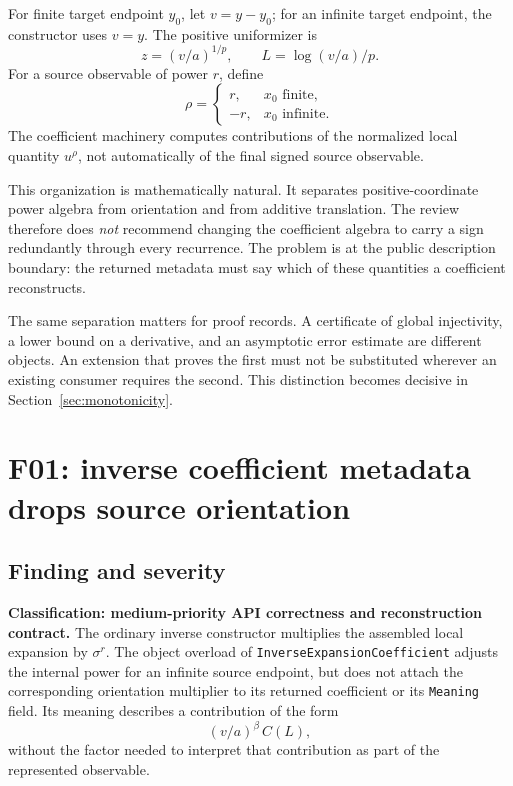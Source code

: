 \documentclass[11pt,letterpaper]{article}
\newcommand{\code}[1]{\nolinkurl{#1}}
\begin{document}
For finite target endpoint \(y_0\), let \(v=y-y_0\); for an infinite target endpoint, the constructor uses \(v=y\). The positive uniformizer is
\[
 z=(v/a)^{1/p},\qquad L=\log(v/a)/p.
\]
For a source observable of power \(r\), define
\[
 \rho=\begin{cases}r,&x_0\text{ finite},\\-r,&x_0\text{ infinite}.
 \end{cases}
\]
The coefficient machinery computes contributions of the normalized local quantity \(u^{\rho}\), not automatically of the final signed source observable.

This organization is mathematically natural. It separates positive-coordinate power algebra from orientation and from additive translation. The review therefore does \emph{not} recommend changing the coefficient algebra to carry a sign redundantly through every recurrence. The problem is at the public description boundary: the returned metadata must say which of these quantities a coefficient reconstructs.

The same separation matters for proof records. A certificate of global injectivity, a lower bound on a derivative, and an asymptotic error estimate are different objects. An extension that proves the first must not be substituted wherever an existing consumer requires the second. This distinction becomes decisive in Section~\ref{sec:monotonicity}.

\section{F01: inverse coefficient metadata drops source orientation}
\label{sec:orientation}

\subsection{Finding and severity}
\textbf{Classification: medium-priority API correctness and reconstruction contract.}
The ordinary inverse constructor multiplies the assembled local expansion by \(\sigma^r\). The object overload of \code{InverseExpansionCoefficient} adjusts the internal power for an infinite source endpoint, but does not attach the corresponding orientation multiplier to its returned coefficient or its \code{Meaning} field. Its meaning describes a contribution of the form
\[
 (v/a)^{\beta}\,C(L),
\]
without the factor needed to interpret that contribution as part of the represented observable.\cite{core}
\end{document}

